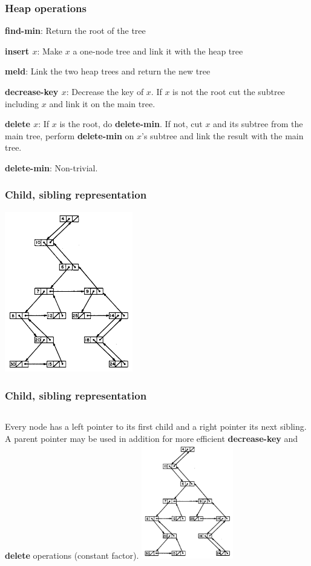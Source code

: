\documentclass{beamer}
\begin{document}
\begin{frame}
\frametitle{Heap operations}

\textbf{find-min}: Return the root of the tree

\textbf{insert $x$}: Make $x$ a one-node tree and link it with the heap tree

\textbf{meld}: Link the two heap trees and return the new tree

\textbf{decrease-key $x$}: Decrease the key of $x$. If $x$ is not the root cut
the subtree including $x$ and link it on the main tree.

\textbf{delete $x$}: If $x$ is the root, do \textbf{delete-min}. If not, cut $x$
and its subtree from the main tree, perform \textbf{delete-min} on $x$'s subtree
and link the result with the main tree.

\textbf{delete-min}: Non-trivial.

\end{frame}

\begin{frame}
\frametitle{Child, sibling representation}

\includegraphics[height=7cm]{fig3.png}
\end{frame}

\begin{frame}
\frametitle{Child, sibling representation}

\begin{columns}[c]
Every node has a left pointer to its first child and a right pointer its next
sibling.\\

A parent pointer may be used in addition for more efficient
\textbf{decrease-key} and \textbf{delete} operations (constant factor).
\includegraphics[height=5cm]{fig3.png}
\end{columns}

\end{frame}
\end{document}
